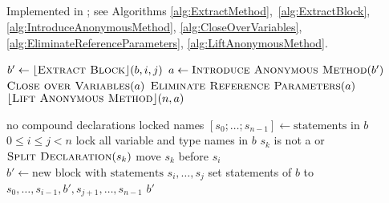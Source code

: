 \subsection{}
Implemented in ; 
see Algorithms \ref{alg:ExtractMethod},~\ref{alg:ExtractBlock}, \ref{alg:IntroduceAnonymousMethod}, %
\ref{alg:CloseOverVariables}, %
\ref{alg:EliminateReferenceParameters}, \ref{alg:LiftAnonymousMethod}.

\begin{algorithm}[p]
\caption{$\refactoring{Extract Method}(b \colon \type{Block}, i \colon \type{nat}, j \colon \type{nat}, n \colon \type{ident}) \colon \type{Method}$}
\label{alg:ExtractMethod}
\begin{algorithmic}[1]
\REQUIRE
\ENSURE
\medskip
\STATE $b' \leftarrow \lfloor\textsc{Extract Block}\rfloor(b, i, j)$
\STATE $a \leftarrow \textsc{Introduce Anonymous Method}(b')$
\STATE $\textsc{Close over Variables}(a)$
\STATE $\textsc{Eliminate Reference Parameters}(a)$
\RETURN $\lfloor\textsc{Lift Anonymous Method}\rfloor(n, a)$
\end{algorithmic}
\end{algorithm}


\begin{algorithm}[p]
\caption{$\refactoring{Extract Block}(b \colon \type{Block}, i \colon \type{nat}, j \colon \type{nat}) \colon \type{Block}$}
\label{alg:ExtractBlock}
\begin{algorithmic}[1]
\REQUIRE no compound declarations
\ENSURE locked names
\medskip
\STATE $[s_0;\ldots;s_{n-1}] \leftarrow \text{statements in $b$}$
\STATE \assert $0\leq i\leq j<n$
\STATE lock all variable and type names in $b$
  \STATE \assert $s_k$ is not a  or 
    \STATE $\textsc{Split Declaration}(s_k)$
    \STATE move $s_k$ before $s_i$
  \ENDIF
\ENDFOR
\STATE $b' \leftarrow \text{new block with statements $s_i,\ldots,s_j$}$
\STATE set statements of $b$ to $s_0,\ldots,s_{i-1},b',s_{j+1},\ldots,s_{n-1}$
\RETURN $b'$
\end{algorithmic}
\end{algorithm}

